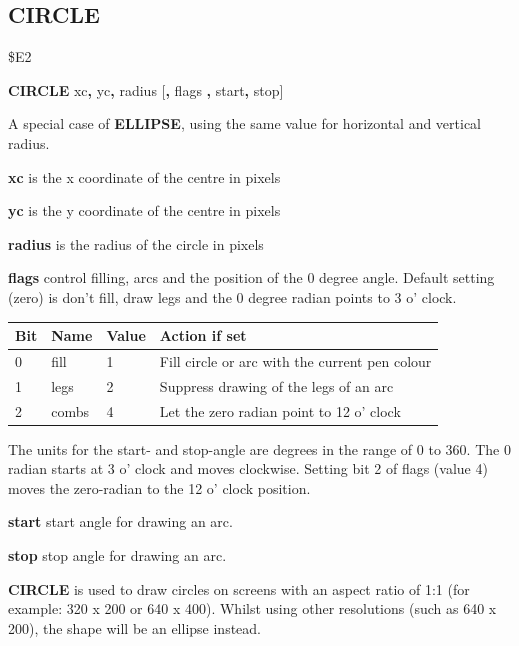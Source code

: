 \subsection{CIRCLE}
\begin{description}[leftmargin=2cm,style=nextline]
\item [Token:] \$E2
\item [Format:] {\bf CIRCLE} xc{\bf,} yc{\bf,} radius [{\bf,} flags
                {\bf,} start{\bf,} stop]
\item [Usage:] A special case of
               {\bf ELLIPSE}, using the same value for
               horizontal and vertical radius.

               {\bf xc} is the x coordinate of the centre in pixels

               {\bf yc} is the y coordinate of the centre in pixels

               {\bf radius} is the radius of the circle in pixels

               {\bf flags} control filling, arcs and
                           the position of the 0 degree angle.
               Default setting (zero) is don't fill, draw legs
               and the 0 degree radian points to 3 o' clock.

{\setlength{\tabcolsep}{1.5mm}
\begin{tabular}{|l|l|l|l|}
\hline
{\bf Bit}  & {\bf Name} & {\bf Value} & {\bf Action if set} \\
\hline
  0 & fill  & 1  & Fill circle or arc with the current pen colour \\
  1 & legs  & 2  & Suppress drawing of the legs of an arc \\
  2 & combs & 4  & Let the zero radian point to 12 o' clock \\
\hline
\end{tabular}
}

               The units for the start- and stop-angle are degrees
               in the range of 0 to 360. The 0 radian starts
               at 3 o' clock and moves clockwise.
               Setting bit 2 of flags (value 4) moves the zero-radian
               to the 12 o' clock position.

               {\bf start} start angle for drawing an arc.

               {\bf stop} stop angle for drawing an arc.



\item [Remarks:] {\bf CIRCLE} is used to draw circles on
               screens with an aspect ratio of 1:1 (for example: 320 x 200
               or 640 x 400). Whilst using other resolutions (such as 640 x 200),
               the shape will be an ellipse instead.


\end{description}
